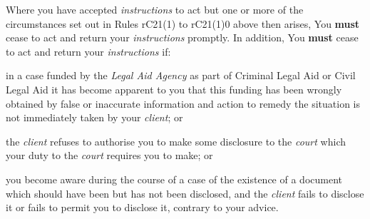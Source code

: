 


Where you have accepted \emph{instructions} to act but one or more of
the circumstances set out in Rules rC21(1) to rC21(1)0 above then arises,
You \textcolor{myred}{\textbf{must}} cease to act and return your \emph{instructions} promptly. In
addition, You \textcolor{myred}{\textbf{must}} cease to act and return your \emph{instructions} if:
\begin{numlist}\item in a case funded by the \emph{Legal Aid Agency} as part of Criminal
Legal Aid or Civil Legal Aid it has become apparent to you that this
funding has been wrongly obtained by false or inaccurate information and
action to remedy the situation is not immediately taken by your
\emph{client}; or
\item the \emph{client} refuses to authorise you to make some disclosure to
the \emph{court} which your duty to the \emph{court} requires you to
make; or
\item you become aware during the course of a case of the existence of a
document which should have been but has not been disclosed, and the
\emph{client} fails to disclose it or fails to permit you to disclose
it, contrary to your advice.
\end{numlist}


